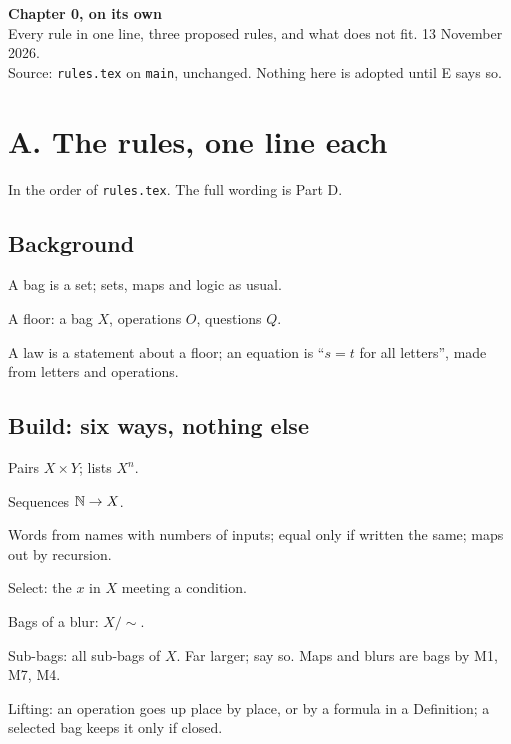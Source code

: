 


\begin{center}
{\Large\bfseries Chapter 0, on its own}\\[4pt]
{\small Every rule in one line, three proposed rules, and what does not fit. 13 November 2026.}\\[2pt]
{\small Source: \texttt{rules.tex} on \texttt{main}, unchanged. Nothing here is adopted until E says so.}
\end{center}

\tableofcontents

\section*{A. The rules, one line each}

In the order of \texttt{rules.tex}. The full wording is Part D.

\subsection*{Background}
\begin{lines}
\item[\lab{S1}] A bag is a set; sets, maps and logic as usual.
\item[\lab{S2}] A floor: a bag $X$, operations $O$, questions $Q$.
\item[\lab{S3}] A law is a statement about a floor; an equation is ``$s = t$ for all letters'', made from letters and operations.
\end{lines}

\subsection*{Build: six ways, nothing else}
\begin{lines}
\item[\lab{M1}] Pairs $X \times Y$; lists $X^n$.
\item[\lab{M2}] Sequences $\mathbb{N} \to X$.
\item[\lab{M3}] Words from names with numbers of inputs; equal only if written the same; maps out by recursion.
\item[\lab{M4}] Select: the $x$ in $X$ meeting a condition.
\item[\lab{M5}] Bags of a blur: $X/{\sim}$.
\item[\lab{M7}] Sub-bags: all sub-bags of $X$. Far larger; say so. Maps and blurs are bags by M1, M7, M4.
\item[\lab{M6}] Lifting: an operation goes up place by place, or by a formula in a Definition; a selected bag keeps it only if closed.
\end{lines}

